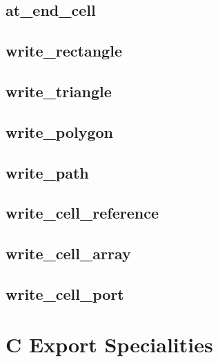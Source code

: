 \subsection{at\_end\_cell}
%
\subsection{write\_rectangle}
%
\subsection{write\_triangle}
%
\subsection{write\_polygon}
%
\subsection{write\_path}
%
\subsection{write\_cell\_reference}
%
\subsection{write\_cell\_array}
%
\subsection{write\_cell\_port}

\section{C Export Specialities}\label{sec:cspecial}



